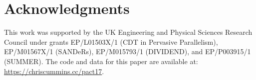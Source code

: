 












\section*{Acknowledgments}

This work was supported by the UK Engineering and Physical Sciences Research
Council under grants EP/L01503X/1 (CDT in Pervasive Parallelism), EP/M01567X/1
(SANDeRs), EP/M015793/1 (DIVIDEND), and EP/P003915/1 (SUMMER). The code and data
for this paper are available at: \url{https://chriscummins.cc/pact17}.

\begingroup
\label{bibliography}
\printbibliography
\balance
\endgroup




